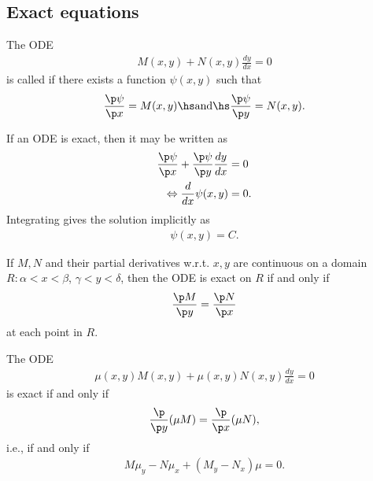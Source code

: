 \documentclass{article}
\begin{document}
\subsection{Exact equations}


\begin{definition}
    The ODE
    \begin{align*}
        M(x,y)+N(x,y)\frac{dy}{dx}=0
    \end{align*}
    is called  if there exists a function $\psi(x,y)$ such that
    \begin{align*}
        \frac{\p \psi}{\p x}=M(x,y)\hs\text{and}\hs\frac{\p\psi}{\p y}=N(x,y).
    \end{align*}
\end{definition}

\begin{theorem}
    If an ODE is exact, then it may be written as
    \begin{align*}
        \frac{\p\psi}{\p x}+\frac{\p\psi}{\p y}\frac{dy}{dx}&=0\\
        \Leftrightarrow \frac{d}{dx}\psi(x,y)&=0.
    \end{align*}
    Integrating gives the solution implicitly as
    \begin{align*}
        \psi(x,y)=C.
    \end{align*}
\end{theorem}

\begin{theorem}
    If $M,N$ and their partial derivatives w.r.t. $x,y$ are continuous
    on a domain $R:\alpha<x<\beta$, $\gamma<y<\delta$, then the ODE is
    exact on $R$ if and only if
    \begin{align*}
        \frac{\p M}{\p y}=\frac{\p N}{\p x}
    \end{align*}
    at each point in $R$.
\end{theorem}

\begin{theorem}
    The ODE
    \begin{align*}
        \mu(x,y)M(x,y)+\mu(x,y)N(x,y)\frac{dy}{dx}=0
    \end{align*}
    is exact if and only if
    \begin{align*}
        \frac{\p}{\p y}(\mu M)=\frac{\p}{\p x}(\mu N),
    \end{align*}
    i.e., if and only if
    \begin{align*}
        M\mu_y - N\mu_x + (M_y - N_x)\mu = 0.
    \end{align*}
\end{theorem}
\end{document}
